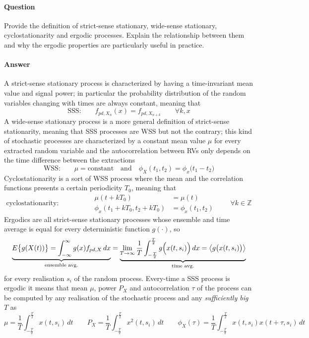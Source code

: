 	
\newquestion
	\paragraph{Question} Provide the definition of strict-sense stationary, wide-sense stationary, cyclostationarity and ergodic processes. Explain the relationship between them and why the ergodic properties are particularly useful in practice.
	
	\paragraph{Answer} A strict-sense stationary process is characterized by having a time-invariant mean value and signal power; in particular the probability distribution of the random variables changing with times are always constant, meaning that
	\[ \text{SSS:} \qquad f_{pd,X_n}(x) = f_{pd,X_{n+k}} \qquad \forall k,x \]
	A wide-sense stationary process is a more general definition of strict-sense stationarity, meaning that SSS processes are WSS but not the contrary; this kind of stochastic processes are characterized by a constant mean value $\mu$ for every extracted random variable and the autocorrelation between RVs only depends on the time difference between the extractions
	\[ \text{WSS:} \qquad \mu = \textrm{constant} \quad \text{and} \quad \phi_X(t_1,t_2) = \phi_x \big(t_1-t_2\big)  \]
	Cyclostationarity is a sort of WSS process where the mean and the correlation functions presents a certain periodicity $T_0$, meaning that
	\[ \text{cyclostationarity:} \hspace{2cm} \begin{aligned}
		\mu(t+kT_0) & = \mu(t) \\
		\phi_x(t_1 + kT_0,t_2+kT_0) & = \phi_x(t_1,t_2) 
	\end{aligned} \qquad \forall k\in \mathds Z \]
	Ergodics are all strict-sense stationary processes whose ensemble and time average is equal for every deterministic function $g(\cdot)$, so
	\[ \underbrace{E\big\{ g(X(t)) \big\} = \int_{-\infty}^\infty g(x) f_{pd,X}\, dx }_{\text{ensemble avg.}} = \underbrace{\lim_{T\rightarrow\infty} \frac 1 T \int_{-\frac T2}^{\frac T2} g\Big( x(t,s_i) \Big)\, dx = \big\langle g\big( x(t,s_i) \big) \big\rangle }_{\text{time avg.}} \]
	for every realisation $s_i$ of the random process. Every-time a SSS process is ergodic it means that mean $\mu$, power $P_X$ and autocorrelation $\tau$ of the process can be computed by any realisation of the stochastic process and any \textit{sufficiently big} $T$ as
	\[ \mu = \frac 1 T \int_{-\frac T2}^{\frac T2} x(t,s_i)\, dt \qquad P_X = \frac 1 T \int_{-\frac T2}^{\frac T2} x^2(t,s_i)\, dt \qquad \phi_X(\tau) = \frac 1 T \int_{-\frac T2}^{\frac T2} x(t,s_i)x(t+\tau,s_i)\, dt \]
	
